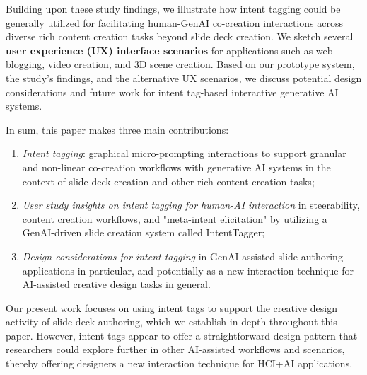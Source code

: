 Building upon these study findings, we illustrate how intent tagging could be generally utilized for facilitating human-GenAI co-creation interactions across diverse rich content creation tasks beyond slide deck creation. 
We sketch several \textbf{user experience (UX) interface scenarios} for applications such as web blogging, video creation, and 3D scene creation.
Based on our prototype system, the study's findings, and the alternative UX scenarios, we discuss potential design considerations and future work for intent tag-based interactive generative AI systems. 



In sum, this paper makes three main contributions:
\begin{enumerate}
    \item \textit{Intent tagging}: graphical micro-prompting interactions to support granular and non-linear co-creation workflows with generative AI systems in the context of slide deck creation and other rich content creation tasks;

    \item \textit{User study insights on intent tagging for human-AI interaction} in steerability, content creation workflows, and "meta-intent elicitation" by utilizing a GenAI-driven slide creation system called IntentTagger;

    \item \textit{Design considerations for intent tagging} in GenAI-assisted slide authoring applications in particular, and potentially as a new interaction technique for AI-assisted creative design tasks in general. 

\end{enumerate}

Our present work focuses on using intent tags to support the creative design activity of slide deck authoring, which we establish in depth throughout this paper. However, intent tags appear to offer a straightforward design pattern that researchers could explore further in other AI-assisted workflows and scenarios, thereby offering designers a new interaction technique for HCI+AI applications.



